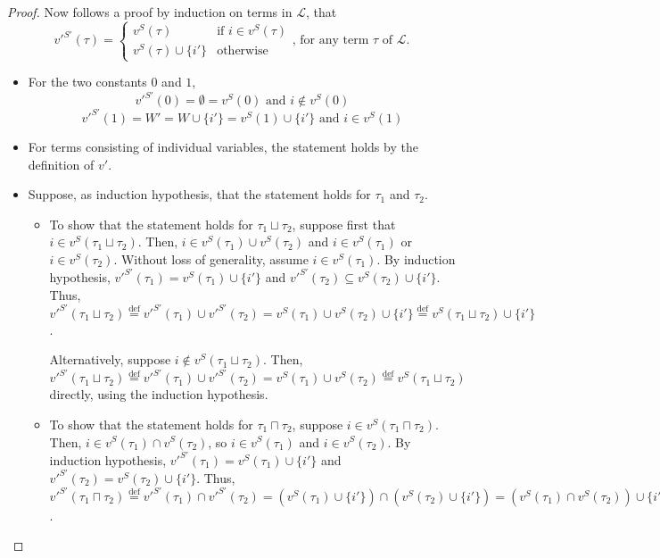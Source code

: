 \documentclass{article}
\newcommand{\lang}{\mathcal{L}}
\newcommand{\lcup}{\sqcup}
\newcommand{\lcap}{\sqcap}
\newcommand{\eqdef}{\stackrel{\text{def}}{=}}
\begin{document}
\begin{proof}
Now follows a proof by induction on terms in $\lang$, that
\begin{equation*}
  v'^{S'}(\tau) =
  \begin{cases}
    v^S(\tau)             & \text{if } i \in v^S(\tau) \\
    v^S(\tau) \cup \{i'\} & \text{otherwise}
  \end{cases}
  \text{, for any term } \tau \text{ of } \lang.
\end{equation*}
\begin{itemize}
  \item For the two constants $0$ and $1$,
    \begin{equation*}
      v'^{S'}(0) = \emptyset = v^S(0) \text{ and } i \not \in v^S(0)
    \end{equation*}
    \begin{equation*}
      v'^{S'}(1) = W' = W \cup \{i'\} = v^S(1) \cup \{i'\} \text{ and } i \in v^S(1)
    \end{equation*}
  \item For terms consisting of individual variables, the statement holds by the definition of $v'$.
  \item Suppose, as induction hypothesis, that the statement holds for $\tau_1$ and $\tau_2$.
    \begin{itemize}
    \item To show that the statement holds for $\tau_1 \lcup \tau_2$, suppose first that $i \in v^S(\tau_1 \lcup \tau_2)$. Then, $i \in v^S(\tau_1) \cup v^S(\tau_2)$ and $i \in v^S(\tau_1)$ or $i \in v^S(\tau_2)$. Without loss of generality, assume $i \in v^S(\tau_1)$. By induction hypothesis, $v'^{S'}(\tau_1) = v^S(\tau_1) \cup \{i'\}$ and $v'^{S'}(\tau_2) \subseteq v^S(\tau_2) \cup \{i'\}$. Thus, $v'^{S'}(\tau_1 \lcup \tau_2) \eqdef v'^{S'}(\tau_1) \cup v'^{S'}(\tau_2) = v^S(\tau_1) \cup v^S(\tau_2) \cup \{i'\} \eqdef v^S(\tau_1 \lcup \tau_2) \cup \{i'\}$.

      Alternatively, suppose $i \not \in v^S(\tau_1 \lcup \tau_2)$. Then, $v'^{S'}(\tau_1 \lcup \tau_2) \eqdef v'^{S'}(\tau_1) \cup v'^{S'}(\tau_2) = v^S(\tau_1) \cup v^S(\tau_2) \eqdef v^S(\tau_1 \lcup \tau_2)$ directly, using the induction hypothesis.

    \item To show that the statement holds for $\tau_1 \lcap \tau_2$, suppose $i \in v^S(\tau_1 \lcap \tau_2)$. Then, $i \in v^S(\tau_1) \cap v^S(\tau_2)$, so $i \in v^S(\tau_1)$ and $i \in v^S(\tau_2)$. By induction hypothesis, $v'^{S'}(\tau_1) = v^S(\tau_1) \cup \{i'\}$ and $v'^{S'}(\tau_2) = v^S(\tau_2) \cup \{i'\}$. Thus, $v'^{S'}(\tau_1 \lcap \tau_2) \eqdef v'^{S'}(\tau_1) \cap v'^{S'}(\tau_2) = (v^S(\tau_1) \cup \{i'\}) \cap (v^S(\tau_2) \cup \{i'\}) = (v^S(\tau_1) \cap v^S(\tau_2)) \cup \{i'\} \eqdef v^S(\tau_1 \lcup \tau_2) \cup \{i'\}$.


\end{itemize}
\end{itemize}
\end{proof}
\end{document}
